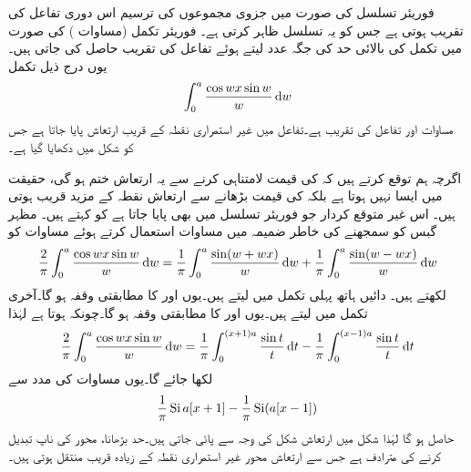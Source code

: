 فوریئر تسلسل کی صورت میں جزوی مجموعوں کی ترسیم اس دوری تفاعل کی تقریب ہوتی ہے جس کو یہ تسلسل ظاہر کرتی ہے۔ فوریئر تکمل (مساوات ) کی صورت میں تکمل کی بالائی حد  کی جگہ عدد  لیتے ہوئے تفاعل کی تقریب حاصل کی جاتی ہیں۔یوں درج ذیل تکمل
\begin{align}\label{مساوات_فوریئر_گبس_الف}
\int_0^a \frac{\cos wx\sin w}{w}\dif w
\end{align}
مساوات  اور تفاعل  کی تقریب ہے۔تفاعل  میں غیر استمراری نقطہ کے قریب  ارتعاش پایا جاتا ہے جس کو شکل  میں دکھایا گیا ہے۔

اگرچہ ہم توقع کرتے ہیں کہ  کی قیمت لامتناہی کرنے سے  یہ ارتعاش ختم ہو گی، حقیقت میں ایسا نہیں ہوتا ہے بلکہ  کی قیمت بڑھانے سے ارتعاش  نقطہ  کے مزید قریب ہوتی ہیں۔ اس غیر متوقع کردار جو فوریئر تسلسل میں بھی پایا جاتا ہے کو  کہتے ہیں۔ مظہر گبس کو سمجھنے کی خاطر  ضمیمہ  میں مساوات  استعمال کرتے ہوئے مساوات  کو 
\begin{align*}
\frac{2}{\pi}\int_0^a\frac{\cos wx\sin w}{w}\dif w=\frac{1}{\pi}\int_0^a \frac{\sin(w+wx)}{w}\dif w+\frac{1}{\pi}\int_0^a 
\frac{\sin(w-wx)}{w}\dif w
\end{align*}
لکھتے ہیں۔ دائیں ہاتھ پہلی تکمل میں  لیتے ہیں۔یوں   اور  کا مطابقتی وقفہ  ہو گا۔آخری تکمل میں  لیتے ہیں۔یوں   اور  کا مطابقتی وقفہ  ہو گا۔چونکہ  ہوتا ہے لہٰذا
\begin{align*}
\frac{2}{\pi}\int_0^a\frac{\cos wx\sin w}{w}\dif w=\frac{1}{\pi}\int_0^{(x+1)a}\frac{\sin t}{t}\dif t-\frac{1}{\pi}\int_0^{(x-1)a} \frac{\sin t}{t}\dif t
\end{align*}
 لکھا جائے گا۔یوں مساوات  کی مدد سے
\begin{align*}
\frac{1}{\pi}\operatorname{Si}{a[x+1]}-\frac{1}{\pi}\operatorname{Si}(a[x-1])
\end{align*}
حاصل ہو گا لہٰذا شکل  میں ارتعاش شکل  کی وجہ سے پائی جاتی ہیں۔حد  بڑھانا، محور کی ناپ تبدیل کرنے کی مترادف ہے جس سے ارتعاش محور غیر استمراری نقطہ کے زیادہ قریب منتقل ہوتی ہیں۔
